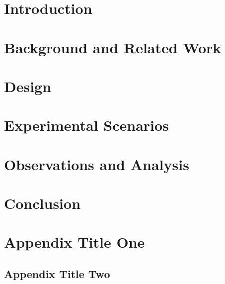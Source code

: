 \documentclass[12pt,letterpaper,oneside]{book}
\begin{document}
\frontmatter
	\flyleaf                        
	\disclaimerpage                 
	\titlepageAFIT                      
	\committeepage  
	
    
    
    \tableofcontents
    \listoffigures
    \listoftables
    \listofalgorithms
    \listofabbreviations
    
\mainmatter
	\chapter{Introduction}
    	
    	
    \chapter{Background and Related Work}
    	
    
    \chapter{Design}
    	
    
    \chapter{Experimental Scenarios}
    	
    
    \chapter{Observations and Analysis}
    		
    
    \chapter{Conclusion}
    	
    
    \begin{appendix}
        \chapter{Appendix Title One}
            \label{appendix:configuration}
           
        \begin{landscape}
        \chapter{Appendix Title Two}
            \label{appendix:performanceDataOutput}
            
        \end{landscape}
    \end{appendix}

\backmatter
	
	 
	
\end{document}
